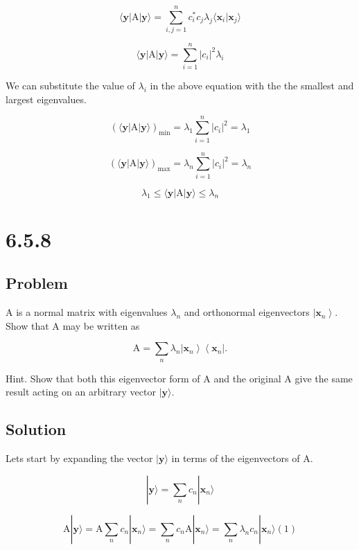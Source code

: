 \documentclass[12pt]{article}
\begin{document}
\[
    \langle\mathbf{y}|\mathrm{A}| \mathbf{y}\rangle = \sum_{i, j=1}^{n} c_i^* c_j \lambda_j \langle\mathbf{x}_i|\mathbf{x}_j\rangle
\]

\[
    \langle\mathbf{y}|\mathrm{A}| \mathbf{y}\rangle = \sum_{i=1}^{n} |c_i|^2 \lambda_i
\]

We can substitute the value of \(\lambda_i\) in the above equation with the the smallest and largest eigenvalues.

\[
    {\left(\langle\mathbf{y}|\mathrm{A}| \mathbf{y}\rangle\right)}_{\min}  = \lambda_1 \sum_{i=1}^{n} |c_i|^2 = \lambda_1
\]

\[
    {\left(\langle\mathbf{y}|\mathrm{A}| \mathbf{y}\rangle\right)}_{\max}  = \lambda_n \sum_{i=1}^{n} |c_i|^2 = \lambda_n
\]

\[
    \lambda_1 \leq\langle\mathbf{y}|\mathrm{A}| \mathbf{y}\rangle \leq \lambda_n
\]

\newpage
\section{6.5.8}

\subsection{Problem}

\(\mathrm{A}\) is a normal matrix with eigenvalues \(\lambda_n\) and orthonormal eigenvectors \(\left|\mathbf{x}_n\right\rangle \). Show that A may be written as

\[
    \mathrm{A}=\sum_n \lambda_n\left|\mathbf{x}_n\right\rangle\left\langle\mathbf{x}_n\right| .
\]

Hint. Show that both this eigenvector form of \(\mathrm{A}\) and the original \(\mathrm{A}\) give the same result acting on an arbitrary vector \(|\mathbf{y}\rangle \).

\subsection{Solution}

Lets start by expanding the vector \(|\mathbf{y}\rangle \) in terms of the eigenvectors of A.

\[
    |\mathbf{y}\rangle = \sum_{n} c_n |\mathbf{x}_n\rangle
\]

\[
    \mathrm{A}|\mathbf{y}\rangle = \mathrm{A} \sum_{n} c_n |\mathbf{x}_n\rangle = \sum_{n} c_n \mathrm{A} |\mathbf{x}_n\rangle
    = \sum_{n} \lambda_n c_n |\mathbf{x}_n\rangle  (1)
\]
\end{document}
